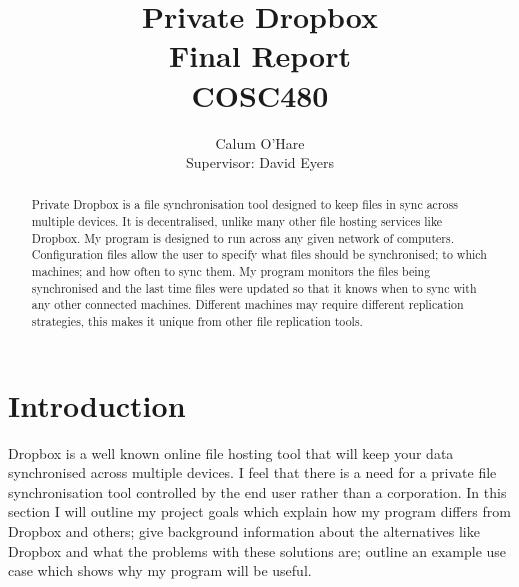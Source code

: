\documentclass[12pt]{article}
\title{ Private Dropbox \\ Final Report \\ COSC480}
\author{Calum O'Hare \\ Supervisor: David Eyers}
\date{}
\begin{document}
\maketitle

\newpage
\begin{abstract}
Private Dropbox is a file synchronisation tool designed to
keep files in sync across multiple devices. It is decentralised,
unlike many other file hosting services like Dropbox.
My program is designed to run across any given network
of computers. Configuration files allow
the user to specify what files should be synchronised; to which
machines; and how often to sync them. My program monitors the 
files being synchronised and the last time files
were updated so that it knows when to sync with any
other connected machines. Different machines may require different replication
strategies, this makes it unique from other file replication tools.
\end{abstract}
\newpage

\tableofcontents
\newpage

\section{Introduction}
Dropbox is a well known online file hosting tool that will
keep your data synchronised across multiple devices. I feel
that there is a need for a private file synchronisation tool
controlled by the end user rather than a corporation. In this
section I will outline my project goals which explain how
my program differs from Dropbox and others; give background
information about the alternatives like Dropbox and what the
problems with these solutions are; outline an example
use case which shows why my program will be useful.
\end{document}
